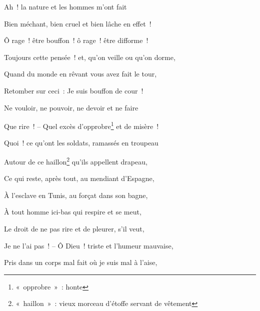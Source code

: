 
{

\bigskip

\setlength{\parskip}{0pt}

Ah~! la nature et les hommes m'ont fait

Bien méchant, bien cruel et bien lâche en effet~!

Ô rage~! être bouffon~! ô rage~! être difforme~!

Toujours cette pensée~! et, qu'on veille ou qu'on dorme,

Quand du monde en rêvant vous avez fait le tour,

Retomber sur ceci~: Je suis bouffon de cour~!

Ne vouloir, ne pouvoir, ne devoir et ne faire

Que rire~! – Quel excès d'opprobre\footnote{«~opprobre~»~: honte} et
de misère~!

Quoi~! ce qu'ont les soldats, ramassés en troupeau

Autour de ce haillon\footnote{«~haillon~»~: vieux morceau d'étoffe
servant de vêtement} qu'ils appellent drapeau,

Ce qui reste, après tout, au mendiant d'Espagne,

À l'esclave en Tunis, au forçat dans son bagne,

À tout homme ici-bas qui respire et se meut,

Le droit de ne pas rire et de pleurer, s'il veut,

Je ne l'ai pas~! – Ô Dieu~! triste et l'humeur mauvaise,

Pris dans un corps mal fait où je suis mal à l'aise,

}
